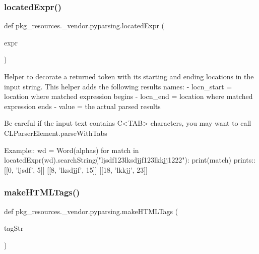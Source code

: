 \subsubsection{\texorpdfstring{located\+Expr()}{locatedExpr()}}
{\footnotesize\ttfamily def pkg\+\_\+resources.\+\_\+vendor.\+pyparsing.\+located\+Expr (\begin{DoxyParamCaption}\item[{}]{expr }\end{DoxyParamCaption})}

\begin{DoxyVerb}Helper to decorate a returned token with its starting and ending locations in the input string.
This helper adds the following results names:
 - locn_start = location where matched expression begins
 - locn_end = location where matched expression ends
 - value = the actual parsed results

Be careful if the input text contains C{<TAB>} characters, you may want to call
C{L{ParserElement.parseWithTabs}}

Example::
    wd = Word(alphas)
    for match in locatedExpr(wd).searchString("ljsdf123lksdjjf123lkkjj1222"):
        print(match)
prints::
    [[0, 'ljsdf', 5]]
    [[8, 'lksdjjf', 15]]
    [[18, 'lkkjj', 23]]
\end{DoxyVerb}
 \mbox{\label{namespacepkg__resources_1_1__vendor_1_1pyparsing_ac8eb7ae7a9b112b67eb33f75d1ab2121}} 
\subsubsection{\texorpdfstring{make\+H\+T\+M\+L\+Tags()}{makeHTMLTags()}}
{\footnotesize\ttfamily def pkg\+\_\+resources.\+\_\+vendor.\+pyparsing.\+make\+H\+T\+M\+L\+Tags (\begin{DoxyParamCaption}\item[{}]{tag\+Str }\end{DoxyParamCaption})}

